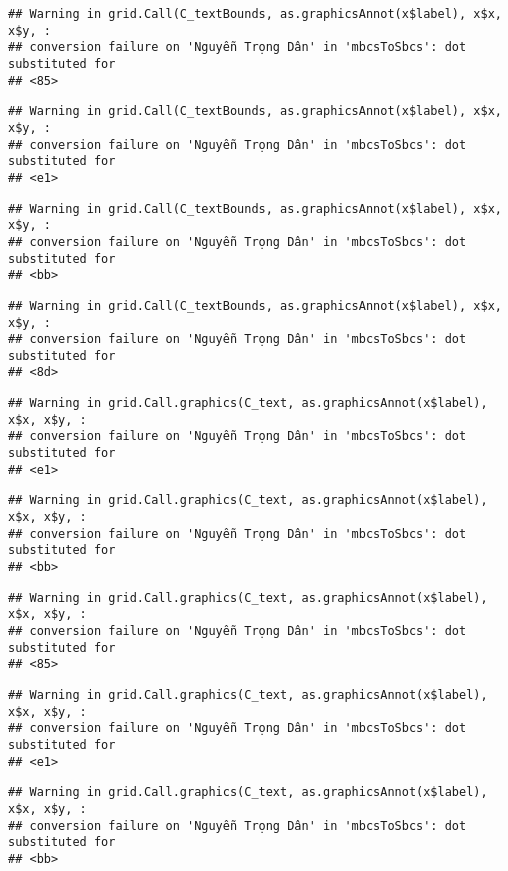 \documentclass[
]{article}
\begin{document}
\begin{verbatim}
## Warning in grid.Call(C_textBounds, as.graphicsAnnot(x$label), x$x, x$y, :
## conversion failure on 'Nguyễn Trọng Dân' in 'mbcsToSbcs': dot substituted for
## <85>
\end{verbatim}

\begin{verbatim}
## Warning in grid.Call(C_textBounds, as.graphicsAnnot(x$label), x$x, x$y, :
## conversion failure on 'Nguyễn Trọng Dân' in 'mbcsToSbcs': dot substituted for
## <e1>
\end{verbatim}

\begin{verbatim}
## Warning in grid.Call(C_textBounds, as.graphicsAnnot(x$label), x$x, x$y, :
## conversion failure on 'Nguyễn Trọng Dân' in 'mbcsToSbcs': dot substituted for
## <bb>
\end{verbatim}

\begin{verbatim}
## Warning in grid.Call(C_textBounds, as.graphicsAnnot(x$label), x$x, x$y, :
## conversion failure on 'Nguyễn Trọng Dân' in 'mbcsToSbcs': dot substituted for
## <8d>
\end{verbatim}

\begin{verbatim}
## Warning in grid.Call.graphics(C_text, as.graphicsAnnot(x$label), x$x, x$y, :
## conversion failure on 'Nguyễn Trọng Dân' in 'mbcsToSbcs': dot substituted for
## <e1>
\end{verbatim}

\begin{verbatim}
## Warning in grid.Call.graphics(C_text, as.graphicsAnnot(x$label), x$x, x$y, :
## conversion failure on 'Nguyễn Trọng Dân' in 'mbcsToSbcs': dot substituted for
## <bb>
\end{verbatim}

\begin{verbatim}
## Warning in grid.Call.graphics(C_text, as.graphicsAnnot(x$label), x$x, x$y, :
## conversion failure on 'Nguyễn Trọng Dân' in 'mbcsToSbcs': dot substituted for
## <85>
\end{verbatim}

\begin{verbatim}
## Warning in grid.Call.graphics(C_text, as.graphicsAnnot(x$label), x$x, x$y, :
## conversion failure on 'Nguyễn Trọng Dân' in 'mbcsToSbcs': dot substituted for
## <e1>
\end{verbatim}

\begin{verbatim}
## Warning in grid.Call.graphics(C_text, as.graphicsAnnot(x$label), x$x, x$y, :
## conversion failure on 'Nguyễn Trọng Dân' in 'mbcsToSbcs': dot substituted for
## <bb>
\end{verbatim}
\end{document}
